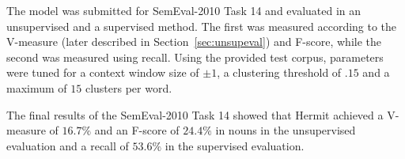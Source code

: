 The model was submitted for SemEval-2010 Task 14 \cite{manandhar2009semeval}
and evaluated in an unsupervised and a supervised method. The first was measured
according to the V-measure (later described in Section~\ref{sec:unsupeval}) and
F-score, while the second was measured using recall. Using the provided test
corpus, parameters were tuned for a context window size of $\pm1$, a clustering
threshold of $.15$ and a maximum of $15$ clusters per word.

The final results of the SemEval-2010 Task 14 showed that Hermit achieved a
V-measure of $16.7\%$ and an F-score of $24.4\%$ in nouns in the unsupervised
evaluation and a recall of $53.6\%$ in the supervised evaluation.


